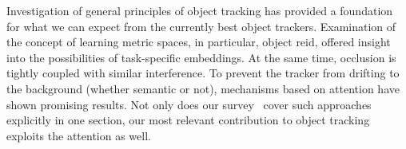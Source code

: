 Investigation of general principles of object tracking has provided a foundation for what we can expect from the currently best object trackers. Examination of the concept of learning metric spaces, in particular, object \gls{reid}, offered insight into the possibilities of task-specific embeddings. At the same time, occlusion is tightly coupled with similar interference. To prevent the tracker from drifting to the background (whether semantic or not), mechanisms based on attention have shown promising results. Not only does our survey~\cite{ondrasovic2021siamese} cover such approaches explicitly in one section, our most relevant contribution to object tracking exploits the attention as well.
